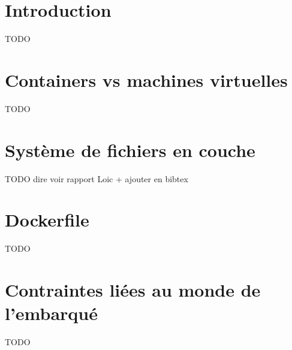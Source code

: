 \section{Introduction}

TODO

\section{Containers vs machines virtuelles}

TODO    

\section{Système de fichiers en couche}

TODO dire voir rapport Loic + ajouter en bibtex


\section{Dockerfile}
TODO

\section{Contraintes liées au monde de l'embarqué}
TODO